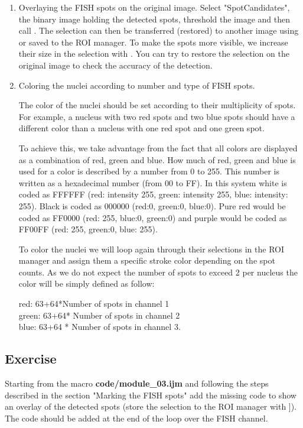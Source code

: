 \begin{enumerate}
    \item Overlaying the FISH spots on the original image.
    Select "SpotCandidates", the binary image holding the detected spots, threshold the image and then call . The selection can then be transferred (restored) to another image using  or saved to the ROI manager. To make the spots more visible, we increase their size in the selection with . You can try to restore the selection on the original image to check the accuracy of the detection.

    \item Coloring the nuclei according to number and type of FISH spots.
    
    The color of the nuclei should be set according to their multiplicity of spots. For example, a nucleus with two red spots and two blue spots should have a different color than a nucleus with one red spot and one green spot.
    
    To achieve this, we take advantage from the fact that all colors are displayed as a combination of red, green and blue. How much of red, green and blue is used for a color is described by a number from 0 to 255. This number is written as a hexadecimal number (from 00 to FF). In this system white is coded as FFFFFF (red: intensity 255, green: intensity 255, blue: intensity: 255). Black is coded as 000000 (red:0, green:0, blue:0). Pure red would be coded as FF0000 (red: 255, blue:0, green:0) and purple would be coded as FF00FF (red: 255, green:0, blue: 255).
    
    To color the nuclei we will loop again through their selections in the ROI manager and assign them a specific stroke color depending on the spot counts. As we do not expect the number of spots to exceed 2 per nucleus the color will be simply defined as follow:
    
    red: 63+64*Number of spots in channel 1\\
    green: 63+64* Number of spots in channel 2\\
    blue: 63+64 * Number of spots in channel 3.
    
\end{enumerate}

\subsection{Exercise  }
Starting from the macro \textbf{code/module\_03.ijm} and following the steps described in the section "Marking the FISH spots" add the missing code to show an overlay of the detected spots (store the selection to the ROI manager with \ijmenu{[Edit > Selection > Add to Manager}]). The code should be added at the end of the loop over the FISH channel.

